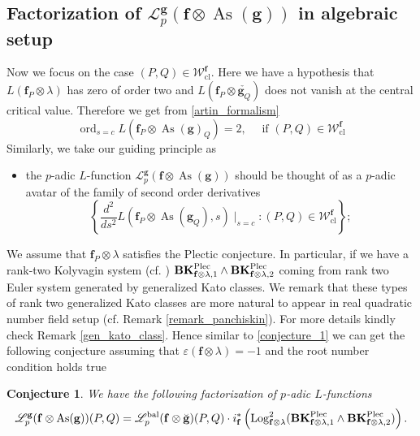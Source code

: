 \documentclass[10pt]{amsart}
\makeatletter
\numberwithin{equation}{section}
\newcommand{\mylabel}[2]{#2\def\@currentlabel{#2}\label{#1}}
\newtheorem{conj}{Conjecture}
\theoremstyle{definition}
\theoremstyle{remark} %
\newcommand{\scr}{\mathscr}
\newcommand{\mrm}{\mathrm}
\newcommand{\As}{\operatorname{As}}
\newcommand{\Log}{\operatorname{Log}}
\renewcommand{\b}{\mathrm{bal}}
\newcommand{\f}{\mathbf{f}}
\newcommand{\g}{\mathbf{g}}
\newcommand{\W}{\mathcal{W}}
\makeatother
\begin{document}
	\subsection{Factorization of $\scr{L}^{\g}_p(\f \otimes \As(\g))$ in algebraic setup} 
	\label{rank2_scenario}
	Now we focus on the case $ (P,Q) \in \W_{\mrm{cl}}^{\f} $. Here we have a hypothesis that $  L(\f_P \otimes \lambda) $ has zero of order two and $ L(\f_P \otimes \check{\g_Q}) $ does not vanish at the central critical value. Therefore we get from \eqref{artin_formalism}
	\begin{equation*}
		\operatorname{ord}_{s=c}L(\f_P \otimes \As(\g)_Q) = 2, \quad \text{ if } (P,Q) \in \W_{\mrm{cl}}^{\f}
	\end{equation*}
	Similarly, we take our guiding principle as
	\begin{itemize}
		\item[ \mylabel{BDP3}{\textbf{(BDP3)}}] the $p$-adic $L$-function $\scr{L}^{\g}_p(\f \otimes \As(\g))$ should be thought of as a $p$-adic avatar of the family of second order derivatives 
		$$ \left\lbrace 	\frac{d^2}{ds^2}	L(\f_P \otimes  \operatorname{As}(\g_Q),s)\mid_{s=c} \colon (P,Q) \in \W_{\mrm{cl}}^{\f} \right\rbrace ; $$ 
	\end{itemize}
	We assume that $ \f_P \otimes \lambda $ satisfies the Plectic conjecture. In particular, if we have a rank-two Kolyvagin system (cf. \cite{BSS18}) $ \mathbf{BK}^{\rm Plec}_{\f\otimes \lambda,1} \wedge \mathbf{BK}^{\rm Plec}_{\f\otimes \lambda,2} $ coming from rank two Euler system generated by generalized Kato classes. We remark that these types of rank two generalized Kato classes are more natural to appear in real quadratic number field setup (cf. Remark \ref{remark_panchiskin}). For more details kindly check Remark \ref{gen_kato_class}. Hence similar to \cref{conjecture_1} we can get the following conjecture assuming that $\varepsilon(\f \otimes \lambda)=-1$ and the root number condition holds true
	\begin{conj}
		\label{conjecture:3}
		We have the following factorization of $p$-adic $L$-functions
		\begin{equation}
			\scr{L}_p^{\g}(\f \otimes \As(\g) )(P,Q)  = \scr{L}_p^{\b}(\f \otimes \breve{\g} )(P,Q)\cdot i^*_\f\left(\Log^2_{\f \otimes \lambda}(\mathbf{BK}^{\rm Plec}_{\f\otimes \lambda,1} \wedge \mathbf{BK}^{\rm Plec}_{\f\otimes \lambda,2} )\right) .
		\end{equation} 
	\end{conj}
\end{document}
